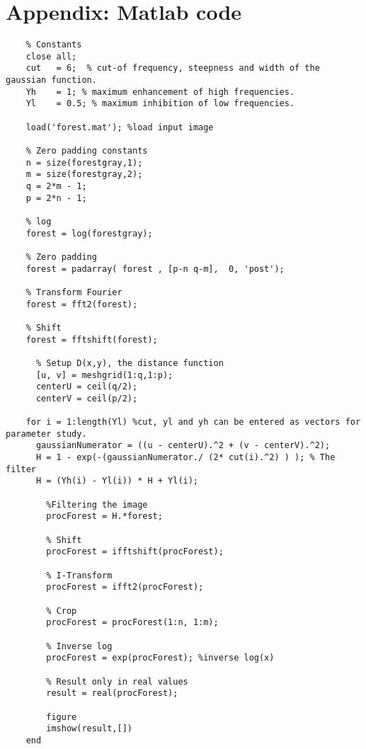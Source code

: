 \section{Appendix: Matlab code}
  \begin{lstlisting}
    % Constants
    close all;
    cut   = 6;  % cut-of frequency, steepness and width of the gaussian function.
    Yh    = 1; % maximum enhancement of high frequencies.
    Yl    = 0.5; % maximum inhibition of low frequencies.

    load('forest.mat'); %load input image

    % Zero padding constants
    n = size(forestgray,1);
    m = size(forestgray,2);
    q = 2*m - 1;
    p = 2*n - 1; 

    % log
    forest = log(forestgray);

    % Zero padding
    forest = padarray( forest , [p-n q-m],  0, 'post');   

    % Transform Fourier
    forest = fft2(forest);                                

    % Shift
    forest = fftshift(forest);                            
      
      % Setup D(x,y), the distance function
      [u, v] = meshgrid(1:q,1:p);
      centerU = ceil(q/2);
      centerV = ceil(p/2);

    for i = 1:length(Yl) %cut, yl and yh can be entered as vectors for parameter study.
      gaussianNumerator = ((u - centerU).^2 + (v - centerV).^2);
      H = 1 - exp(-(gaussianNumerator./ (2* cut(i).^2) ) ); % The filter
      H = (Yh(i) - Yl(i)) * H + Yl(i);
      
        %Filtering the image
        procForest = H.*forest;

        % Shift
        procForest = ifftshift(procForest);

        % I-Transform
        procForest = ifft2(procForest);

        % Crop
        procForest = procForest(1:n, 1:m);

        % Inverse log
        procForest = exp(procForest); %inverse log(x)

        % Result only in real values
        result = real(procForest);

        figure
        imshow(result,[])
    end
  \end{lstlisting}
